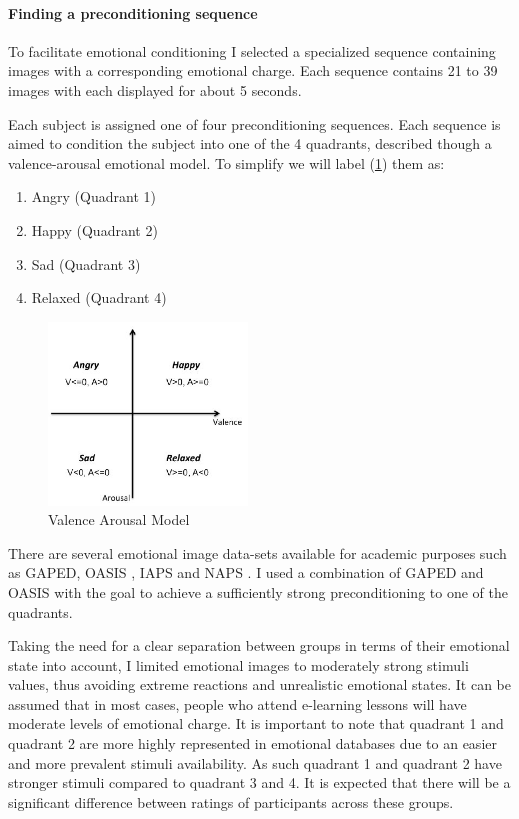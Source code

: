 \paragraph{Finding a preconditioning sequence}
To facilitate emotional conditioning I selected a specialized sequence containing images with a corresponding emotional charge.
Each sequence contains 21 to 39 images with each displayed for about 5 seconds.

Each subject is assigned one of four preconditioning sequences. Each sequence is aimed to condition the subject into one of the 4 quadrants, described though a valence-arousal emotional model. To simplify we will label (\ref{fig:valence_arousal_model}) them as:
\begin{enumerate}
	\item Angry (Quadrant 1)
	\item Happy (Quadrant 2)
	\item Sad (Quadrant 3)
	\item Relaxed (Quadrant 4)
\end{enumerate}


\begin{figure}
\begin{center}
	\includegraphics[width=200px]{graphics/Valence-Arousal-model-showing-the-quadrants-of-the-four-emotion-tags-used-in-this_W640.jpg}
	\caption{Valence Arousal Model \cite{Song2013} \label{fig:valence_arousal_model}}
	
\end{center}
\end{figure}

There are several emotional image data-sets available for academic purposes such as GAPED, OASIS \cite{Kurdi2017}, IAPS and NAPS \cite{Marchewka2014}. I used a combination of GAPED and OASIS with the goal to achieve a sufficiently strong preconditioning to one of the quadrants.

Taking the need for a clear separation between groups in terms of their emotional state into account, I limited emotional images to moderately strong stimuli values, thus avoiding extreme reactions and unrealistic emotional states. It can be assumed that in most cases, people who attend e-learning lessons will have moderate levels of emotional charge. It is important to note that quadrant 1 and quadrant 2 are more highly represented in emotional databases due to an easier and more prevalent stimuli availability. As such quadrant 1 and quadrant 2 have stronger stimuli compared to quadrant 3 and 4. It is expected that there will be a significant difference between ratings of participants across these groups.

